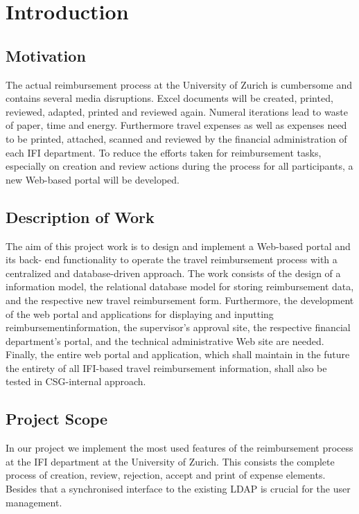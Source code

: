 \chapter{Introduction}

\section{Motivation}

The actual reimbursement process at the University of Zurich is cumbersome and contains several media disruptions. Excel documents will be created, printed, reviewed, adapted, printed and reviewed again. Numeral iterations lead to waste of paper, time and energy. Furthermore travel expenses as well as expenses need to be printed, attached, scanned and reviewed by the financial administration of each IFI department. To reduce the efforts taken for reimbursement tasks, especially on creation and review actions during the process for all participants, a new Web-based portal will be developed.

\section{Description of Work}

The aim of this project work is to design and implement a Web-based portal and its back- end functionality to operate the travel reimbursement process with a centralized and database-driven approach. The work consists of the design of a information model, the relational database model for storing reimbursement data, and the respective new travel reimbursement form. Furthermore, the development of the web portal and applications for displaying and inputting reimbursementinformation, the supervisor’s approval site, the respective financial department’s portal, and the technical administrative Web site are needed. Finally, the entire web portal and application, which shall maintain in the future the entirety of all IFI-based travel reimbursement information, shall also be tested in CSG-internal approach.


\section{Project Scope}

In our project we implement the most used features of the reimbursement process at the IFI department at the University of Zurich. This consists the complete process of creation, review, rejection, accept and print of expense elements. Besides that a synchronised interface to the existing LDAP is crucial for the user management. 